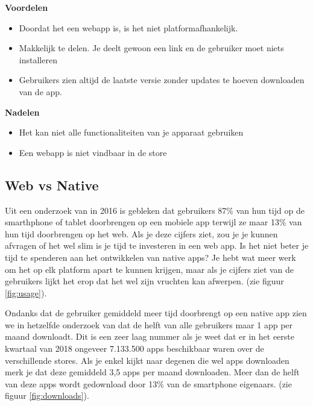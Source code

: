 \begin{minipage}[t]{0.5\textwidth}
	\textbf{Voordelen}
	\begin{itemize}  
		\item Doordat het een webapp is, is het niet platformafhankelijk. 
		\item Makkelijk te delen. Je deelt gewoon een link en de gebruiker moet niets installeren
		\item Gebruikers zien altijd de laatste versie zonder updates te hoeven downloaden van de app.
	\end{itemize}
\end{minipage}
\begin{minipage}[t]{0.5\textwidth}
	\textbf{Nadelen}
	\begin{itemize}  
		\item Het kan niet alle functionaliteiten van je apparaat gebruiken
		\item Een webapp is niet vindbaar in de store
	\end{itemize}
\end{minipage}


\subsection{Web vs Native}
Uit een onderzoek van \textcite{comScore} in 2016 is gebleken  dat gebruikers 87\% van hun tijd op de smarthphone of tablet doorbrengen op een mobiele app terwijl ze maar 13\% van hun tijd doorbrengen op het web. Als je deze cijfers ziet, zou je je kunnen afvragen of het wel slim is je tijd te investeren in een web app. Is het niet beter je tijd te spenderen aan het ontwikkelen van native apps? Je hebt wat meer werk om het op elk platform apart te kunnen krijgen, maar als je cijfers ziet van de gebruikers lijkt het erop dat het wel zijn vruchten kan afwerpen.
(zie figuur \ref{fig:usage}). 

Ondanks dat de gebruiker gemiddeld meer tijd doorbrengt op een native app zien we in hetzelfde onderzoek van \textcite{comScore}  dat de helft van alle gebruikers maar 1 app per maand downloadt. Dit is een zeer laag nummer als je weet dat er in het eerste kwartaal van 2018 ongeveer 7.133.500 apps beschikbaar waren over de verschillende stores. Als je enkel kijkt naar degenen die wel apps downloaden merk je dat deze gemiddeld 3,5 apps per maand downloaden. Meer dan de helft van deze apps wordt gedownload door 13\% van de smartphone eigenaars. (zie figuur \ref{fig:downloads}).

